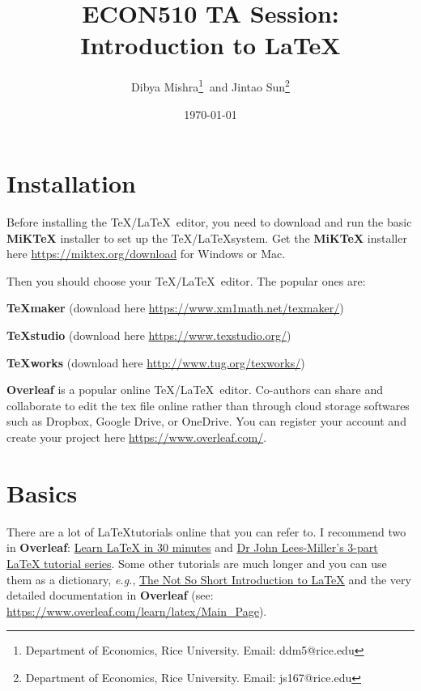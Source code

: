 \documentclass[10pt]{extarticle}
\theoremstyle{theorem}
\theoremstyle{lemma}
\theoremstyle{proposition}
\theoremstyle{corollary}
\theoremstyle{assumption}
\theoremstyle{model}
\theoremstyle{property}
\theoremstyle{example}
\theoremstyle{algorithm}
\theoremstyle{definition}
\theoremstyle{axiom}
\theoremstyle{remark}
\begin{document}
\author{Dibya Mishra\thanks{%
Department of Economics, Rice University. Email: ddm5@rice.edu} $~$and Jintao Sun\thanks{%
Department of Economics, Rice University. Email: js167@rice.edu}}
\title{{\Large ECON510 TA Session: Introduction to \LaTeX}}
\date{\today}
\maketitle

\vspace*{-3em}


\section{Installation}

Before installing the \TeX/\LaTeX \ editor, you need to download and run the basic \textbf{MiKTeX} installer to set up the \TeX/\LaTeX system. Get the \textbf{MiKTeX} installer here \href{https://miktex.org/download}{https://miktex.org/download} for Windows or Mac.

Then you should choose your \TeX/\LaTeX \ editor. The popular ones are:

\textbf{TeXmaker} (download here \href{https://www.xm1math.net/texmaker/}{https://www.xm1math.net/texmaker/}) 

\textbf{TeXstudio} (download here \href{https://www.texstudio.org/}{https://www.texstudio.org/})

\textbf{TeXworks} (download here \href{http://www.tug.org/texworks/}{http://www.tug.org/texworks/})

\textbf{Overleaf} is a popular online \TeX/\LaTeX \ editor. Co-authors can share and collaborate to edit the tex file online rather than through cloud storage softwares such as Dropbox, Google Drive, or OneDrive. You can register your account and create your project here \href{https://www.overleaf.com/}{https://www.overleaf.com/}.


\section{Basics}

There are a lot of \LaTeX tutorials online that you can refer to. I recommend two in \textbf{Overleaf}: \href{https://www.overleaf.com/learn/latex/Learn_LaTeX_in_30_minutes}{Learn LaTeX in 30 minutes} and \href{https://www.overleaf.com/learn/latex/Free\_online\_introduction\_to\_LaTeX\_(part\_1)}{Dr John Lees-Miller's 3-part LaTeX tutorial series}. Some other tutorials are much longer and you can use them as a dictionary, \textit{e.g.}, \href{https://github.com/oetiker/lshort}{The Not So Short Introduction to LaTeX} and the very detailed documentation in \textbf{Overleaf} (see: \href{https://www.overleaf.com/learn/latex/Main\_Page}{https://www.overleaf.com/learn/latex/Main\_Page}).
\end{document}
